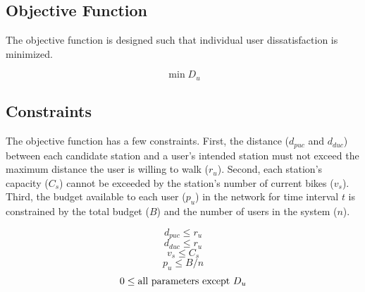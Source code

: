\documentclass[times, 10pt,twocolumn]{article}
\begin{document}
\subsection{Objective Function}
 
The objective function is designed such that individual user dissatisfaction is minimized.

\begin{equation}
\min{D_u}
\end{equation}

\subsection{Constraints}

The objective function has a few constraints. First, the distance ($d_{puc}$ and $d_{duc}$) between each candidate station and a user's intended station must not exceed the maximum distance the user is willing to walk ($r_u$). Second, each station's capacity ($C_s$) cannot be exceeded by the station's number of current bikes ($v_s$). Third, the budget available to each user ($p_u$) in the network for time interval $t$ is constrained by the total budget ($B$) and the number of users in the system ($n$).

\begin{equation}
d_{puc} \leq r_u
\end{equation}
\begin{equation}
d_{duc} \leq r_u
\end{equation}
\begin{equation}
v_s \leq C_s
\end{equation}
\begin{equation}
p_u \leq B/n
\end{equation}
\begin{equation}
0 \leq \textnormal{all parameters except } D_u
\end{equation}
\end{document}
